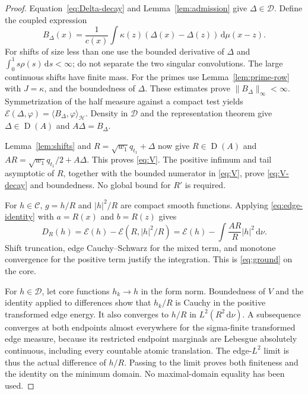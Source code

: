 \documentclass[11pt,a4paper]{article}
\newcommand{\HH}{\mathcal H}
\newcommand{\DD}{\mathcal D}
\newcommand{\EE}{\mathcal E}
\newcommand{\CC}{\mathcal C}
\newcommand{\ip}[2]{\langle #1,#2\rangle}
\newcommand{\norm}[1]{\lVert #1\rVert}
\newcommand{\abs}[1]{\lvert #1\rvert}
\newcommand{\dd}{\,\mathrm d}
\newcommand{\Dom}{\operatorname{D}}
\theoremstyle{definition}
\theoremstyle{remark}
\numberwithin{equation}{section}
\begin{document}
\begin{proof}
Equation~\eqref{eq:Delta-decay} and Lemma~\ref{lem:admission} give
$\Delta\in\DD$. Define the coupled expression
\begin{equation}\label{eq:A-Delta}
 B_\Delta(x)=\frac1{c(x)}\int\kappa(z)
                  (\Delta(x)-\Delta(z))\dd\mu(x-z).
\end{equation}
For shifts of size less than one use the bounded derivative of
$\Delta$ and $\int_0^1s\rho(s)\dd s<\infty$; do not separate the
two singular convolutions. The large continuous shifts have finite mass.
For the primes use Lemma~\ref{lem:prime-row} with $J=\kappa$, and the
boundedness of $\Delta$. These estimates prove
$\norm{B_\Delta}_\infty<\infty$.
Symmetrization of the half measure against a compact test yields
$\EE(\Delta,\varphi)=\ip{B_\Delta}\varphi_{\HH}$.
Density in $\DD$ and the representation theorem give
$\Delta\in\Dom(A)$ and $A\Delta=B_\Delta$.

Lemma~\ref{lem:shifts} and $R=\sqrt{w_1}q_{t_1}+\Delta$ now give
$R\in\Dom(A)$ and
$AR=\sqrt{w_1}q_{t_1}/2+A\Delta$. This proves \eqref{eq:V}.
The positive infimum and tail asymptotic of $R$, together with the
bounded numerator in \eqref{eq:V}, prove \eqref{eq:V-decay} and boundedness.
No global bound for $R'$ is required.

For $h\in\CC$, $g=h/R$ and $\abs h^2/R$ are compact smooth functions.
Applying \eqref{eq:edge-identity} with $a=R(x)$ and $b=R(z)$ gives
\[
 D_R(h)=\EE(h)-\EE(R,\abs h^2/R)
        =\EE(h)-\int\frac{AR}{R}\abs h^2\dd\nu.
\]
Shift truncation, edge Cauchy--Schwarz for the mixed term, and monotone
convergence for the positive term justify the integration. This is
\eqref{eq:ground} on the core.

For $h\in\DD$, let core functions $h_k\to h$ in the form norm. Boundedness
of $V$ and the identity applied to differences show that $h_k/R$ is Cauchy
in the positive transformed edge energy. It also converges to $h/R$ in
$L^2(R^2\dd\nu)$. A subsequence converges at both endpoints almost
everywhere for the sigma-finite transformed edge measure, because its
restricted endpoint marginals are Lebesgue absolutely continuous, including
every countable atomic translation. The edge-$L^2$ limit is thus the actual
difference of $h/R$. Passing to the limit proves both finiteness and the
identity on the minimum domain. No maximal-domain equality has been used.
\end{proof}
\end{document}
